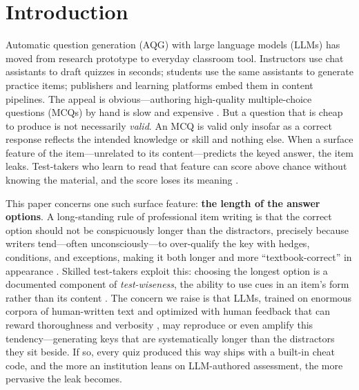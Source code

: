 \documentclass[10pt,twocolumn]{article}
\begin{document}
\section{Introduction}
\label{sec:intro}

Automatic question generation (AQG) with large language models (LLMs) has
moved from research prototype to everyday classroom tool. Instructors use
chat assistants to draft quizzes in seconds; students use the same assistants
to generate practice items; publishers and learning platforms embed them in
content pipelines. The appeal is obvious---authoring high-quality
multiple-choice questions (MCQs) by hand is slow and expensive
\citep{kurdi2020systematic}. But a question that is cheap to produce is not
necessarily \emph{valid}. An MCQ is valid only insofar as a correct response
reflects the intended knowledge or skill and nothing else. When a surface
feature of the item---unrelated to its content---predicts the keyed answer,
the item leaks. Test-takers who learn to read that feature can score above
chance without knowing the material, and the score loses its meaning
\citep{messick1989validity}.

This paper concerns one such surface feature: \textbf{the length of the answer
options}. A long-standing rule of professional item writing is that the
correct option should not be conspicuously longer than the distractors,
precisely because writers tend---often unconsciously---to over-qualify the key
with hedges, conditions, and exceptions, making it both longer and more
``textbook-correct'' in appearance
\citep{haladyna2002review,tarrant2006frequency}. Skilled test-takers exploit
this: choosing the longest option is a documented component of
\emph{test-wiseness}, the ability to use cues in an item's form rather than its
content \citep{millman1965testwiseness}. The concern we raise is that LLMs,
trained on enormous corpora of human-written text and optimized with human
feedback that can reward thoroughness and verbosity
\citep{zheng2023judging,saito2023verbosity}, may reproduce or even amplify
this tendency---generating keys that are systematically longer than the
distractors they sit beside. If so, every quiz produced this way ships with a
built-in cheat code, and the more an institution leans on LLM-authored
assessment, the more pervasive the leak becomes.
\end{document}
